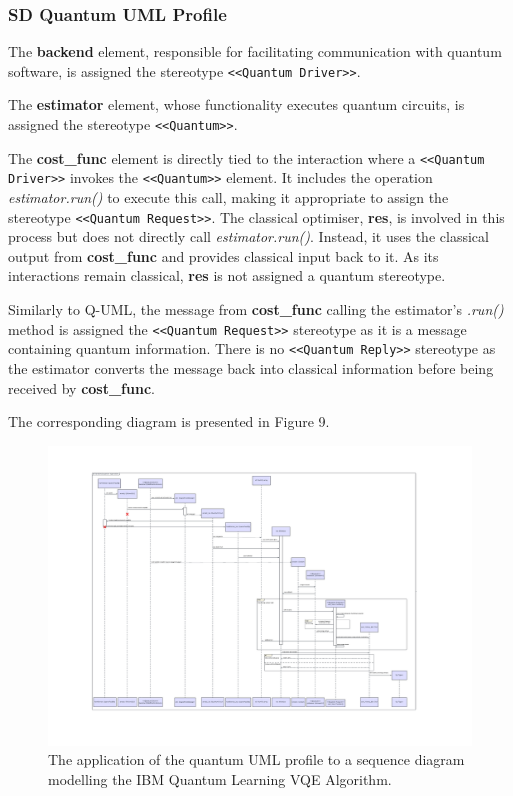 \documentclass{article}
\begin{document}
\subsubsection{SD Quantum UML Profile}

The \textbf{backend} element, responsible for facilitating communication with quantum software, is assigned the stereotype \texttt{<<Quantum Driver>>}.

The \textbf{estimator} element, whose functionality executes quantum circuits, is assigned the stereotype \texttt{<<Quantum>>}.

The \textbf{cost\_func} element is directly tied to the interaction where a \texttt{<<Quantum Driver>>} invokes the \texttt{<<Quantum>>} element. It includes the operation \textit{estimator.run()} to execute this call, making it appropriate to assign the stereotype \texttt{<<Quantum Request>>}. The classical optimiser, \textbf{res}, is involved in this process but does not directly call \textit{estimator.run()}. Instead, it uses the classical output from \textbf{cost\_func} and provides classical input back to it. As its interactions remain classical, \textbf{res} is not assigned a quantum stereotype.

Similarly to Q-UML, the message from \textbf{cost\_func} calling the estimator's \textit{.run()} method is assigned the \texttt{<<Quantum Request>>} stereotype as it is a message containing quantum information. There is no \texttt{<<Quantum Reply>>} stereotype as the estimator converts the message back into classical information before being received by \textbf{cost\_func}.

The corresponding diagram is presented in Figure 9.

\begin{figure}
    \centering
    \includegraphics[width=1\linewidth]{VQE UML Profile SD Final Version.pdf}
    \caption{The application of the quantum UML profile to a sequence diagram modelling the IBM Quantum Learning VQE Algorithm.}
    \label{fig:QUMLP_SD}
\end{figure}
\end{document}
